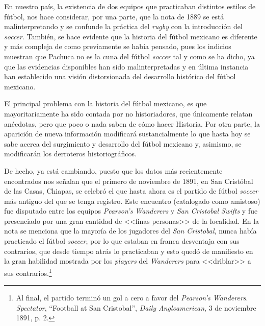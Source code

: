 \documentclass[11pt,a5paper,twoside]{book} %
\begin{document}
En nuestro país, la existencia de dos equipos que practicaban distintos estilos de fútbol, nos hace considerar, por una parte, que la nota de 1889 se está malinterpretando y se confunde la práctica del \emph{rugby} con la introducción del \emph{soccer}. También, se hace evidente que la historia del fútbol mexicano es diferente y más compleja de como previamente se había pensado, pues los indicios muestran que Pachuca no es la cuna del fútbol \emph{soccer} tal y como se ha dicho, ya que las evidencias disponibles han sido malinterpretadas y en última instancia han establecido una visión distorsionada del desarrollo histórico del fútbol mexicano.

El principal problema con la historia del fútbol mexicano, es que mayoritariamente ha sido contada por no historiadores, que únicamente relatan anécdotas, pero que poco o nada saben de cómo hacer Historia. Por otra parte, la aparición de nueva información modificará sustancialmente lo que hasta hoy se sabe acerca del surgimiento y desarrollo del fútbol mexicano y, asimismo, se modificarán los derroteros historiográficos.

De hecho, ya está cambiando, puesto que los datos más recientemente encontrados nos señalan que el primero de noviembre de 1891, en San Cristóbal de las Casas, Chiapas, se celebró el que hasta ahora es el partido de fútbol \emph{soccer} más antiguo del que se tenga registro. Este encuentro (catalogado como amistoso) fue disputado entre los equipos \emph{Pearson's Wanderers} y \emph{San Cristobal Swifts} y fue presenciado por una gran cantidad de <<finas personas>> de la localidad. En la nota se menciona que la mayoría de los jugadores del \emph{San Cristobal}, nunca había practicado el fútbol \emph{soccer}, por lo que estaban en franca desventaja con sus contrarios, que desde tiempo atrás lo practicaban y esto quedó de manifiesto en la gran habilidad mostrada por los \emph{players} del \emph{Wanderers} para <<driblar>> a sus contrarios.\footnote{Al final, el partido terminó un gol a cero a favor del \emph{Pearson's Wanderers}. \emph{Spectator}, ``Football at San Cristobal'', \emph{Daily Angloamerican}, 3 de noviembre 1891, p. 2.}

\newpage
\pagestyle{empty}
\null\vfill

\newpage
\pagestyle{fancy}
\fancyhf{}
\fancyfoot[RO,LE]{\small\thepage}
\renewcommand{\headrulewidth}{0pt}
\setcounter{page}{99}
\end{document}
